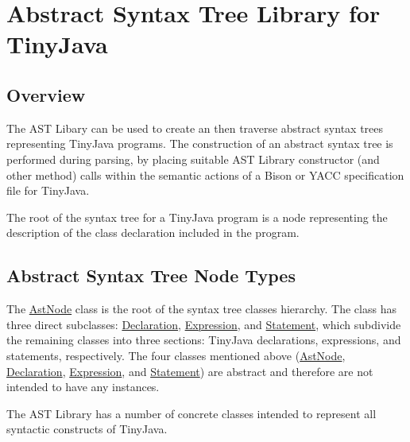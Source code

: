 \hypertarget{main_section_toc}{}\section{Abstract Syntax Tree Library for TinyJava}\label{main_section_toc}
\hypertarget{main_OVERVIEW}{}\subsection{Overview}\label{main_OVERVIEW}
The AST Libary can be used to create an then traverse abstract syntax trees representing TinyJava programs. The construction of an abstract syntax tree is performed during parsing, by placing suitable AST Library constructor (and other method) calls within the semantic actions of a Bison or YACC specification file for TinyJava.

The root of the syntax tree for a TinyJava program is a node representing the description of the class declaration included in the program.\hypertarget{main_NODETYPES}{}\subsection{Abstract Syntax Tree Node Types}\label{main_NODETYPES}
The \hyperlink{classAstNode}{AstNode} class is the root of the syntax tree classes hierarchy. The class has three direct subclasses: \hyperlink{classDeclaration}{Declaration}, \hyperlink{classExpression}{Expression}, and \hyperlink{classStatement}{Statement}, which subdivide the remaining classes into three sections: TinyJava declarations, expressions, and statements, respectively. The four classes mentioned above (\hyperlink{classAstNode}{AstNode}, \hyperlink{classDeclaration}{Declaration}, \hyperlink{classExpression}{Expression}, and \hyperlink{classStatement}{Statement}) are abstract and therefore are not intended to have any instances.

The AST Library has a number of concrete classes intended to represent all syntactic constructs of TinyJava.


